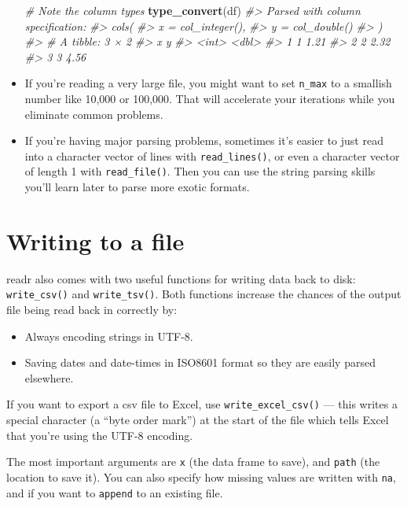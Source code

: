 \documentclass[]{book}
\newenvironment{Shaded}{\begin{snugshade}}{\end{snugshade}}
\newcommand{\KeywordTok}[1]{\textcolor[rgb]{0.13,0.29,0.53}{\textbf{{#1}}}}
\newcommand{\CommentTok}[1]{\textcolor[rgb]{0.56,0.35,0.01}{\textit{{#1}}}}
\newcommand{\NormalTok}[1]{{#1}}
\begin{document}
\begin{itemize}
\begin{Shaded}
\begin{Highlighting}[]
\CommentTok{# Note the column types}
\KeywordTok{type_convert}\NormalTok{(df)}
\CommentTok{#> Parsed with column specification:}
\CommentTok{#> cols(}
\CommentTok{#>   x = col_integer(),}
\CommentTok{#>   y = col_double()}
\CommentTok{#> )}
\CommentTok{#> # A tibble: 3 × 2}
\CommentTok{#>       x     y}
\CommentTok{#>   <int> <dbl>}
\CommentTok{#> 1     1  1.21}
\CommentTok{#> 2     2  2.32}
\CommentTok{#> 3     3  4.56}
\end{Highlighting}
\end{Shaded}
\item
  If you're reading a very large file, you might want to set
  \texttt{n\_max} to a smallish number like 10,000 or 100,000. That will
  accelerate your iterations while you eliminate common problems.
\item
  If you're having major parsing problems, sometimes it's easier to just
  read into a character vector of lines with \texttt{read\_lines()}, or
  even a character vector of length 1 with \texttt{read\_file()}. Then
  you can use the string parsing skills you'll learn later to parse more
  exotic formats.
\end{itemize}

\section{Writing to a file}\label{writing-to-a-file}

readr also comes with two useful functions for writing data back to
disk: \texttt{write\_csv()} and \texttt{write\_tsv()}. Both functions
increase the chances of the output file being read back in correctly by:

\begin{itemize}
\item
  Always encoding strings in UTF-8.
\item
  Saving dates and date-times in ISO8601 format so they are easily
  parsed elsewhere.
\end{itemize}

If you want to export a csv file to Excel, use
\texttt{write\_excel\_csv()} --- this writes a special character (a
``byte order mark'') at the start of the file which tells Excel that
you're using the UTF-8 encoding.

The most important arguments are \texttt{x} (the data frame to save),
and \texttt{path} (the location to save it). You can also specify how
missing values are written with \texttt{na}, and if you want to
\texttt{append} to an existing file.
\end{document}

